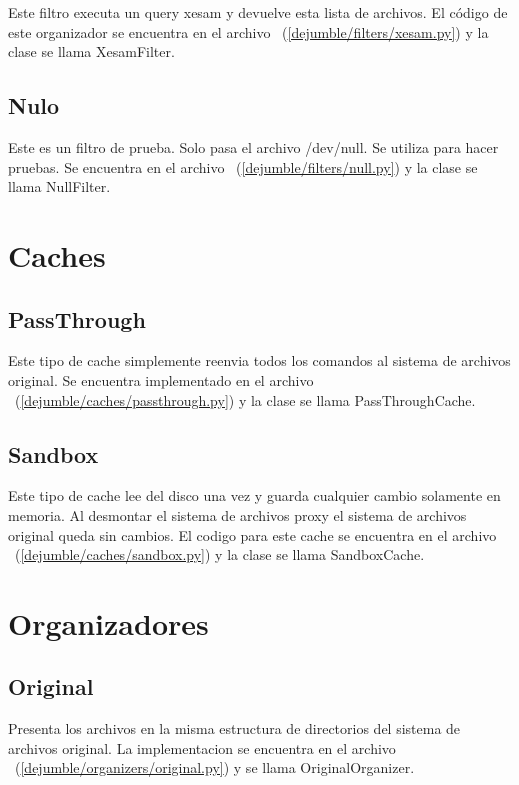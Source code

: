 Este filtro executa un query xesam y devuelve esta lista de archivos. El código de este organizador se encuentra en el archivo ~(\ref{dejumble/filters/xesam.py}) y la clase se llama XesamFilter.

\subsection{Nulo}

Este es un filtro de prueba. Solo pasa el archivo /dev/null. Se utiliza para hacer pruebas. Se encuentra en el archivo ~(\ref{dejumble/filters/null.py}) y la clase se llama NullFilter.


\section{Caches}

\subsection{PassThrough}

Este tipo de cache simplemente reenvia todos los comandos al sistema de archivos original. Se encuentra implementado en el archivo ~(\ref{dejumble/caches/passthrough.py}) y la clase se llama PassThroughCache.

\subsection{Sandbox}

Este tipo de cache lee del disco una vez y guarda cualquier cambio solamente en memoria. Al desmontar el sistema de archivos proxy el sistema de archivos original queda sin cambios. El codigo para este cache se encuentra en el archivo ~(\ref{dejumble/caches/sandbox.py}) y la clase se llama SandboxCache.


\section{Organizadores}

\subsection{Original}

Presenta los archivos en la misma estructura de directorios del sistema de archivos original. La implementacion se encuentra en el archivo ~(\ref{dejumble/organizers/original.py}) y se llama OriginalOrganizer.

